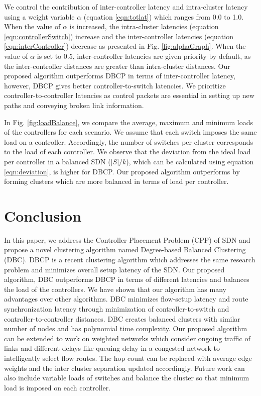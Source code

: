 \documentclass{IEEEtran}
\begin{document}
	We control the contribution of inter-controller latency and intra-cluster latency using a weight variable $\alpha$ (equation \ref{eqn:totlat}) which ranges from 0.0 to 1.0. When the value of $\alpha$ is increased, the intra-cluster latencies (equation \ref{eqn:controllerSwitch}) increase and the inter-controller latencies (equation \ref{eqn:interController}) decrease as presented in Fig. \ref{fig:alphaGraph}. When the value of $\alpha$ is set to $0.5$, inter-controller latencies are given priority by default, as the inter-controller distances are greater than intra-cluster distances. Our proposed algorithm outperforms DBCP in terms of inter-controller latency, however, DBCP gives better controller-to-switch latencies. We prioritize controller-to-controller latencies as control packets are essential in setting up new paths and conveying broken link information.
	
	In Fig. \ref{fig:loadBalance}, we compare the average, maximum and minimum loads of the controllers for each scenario. We assume that each switch imposes the same load on a controller. Accordingly, the number of switches per cluster corresponds to the load of each controller. We observe that the deviation from the ideal load per controller in a balanced SDN ($|S|/k$), which can be calculated using equation \ref{eqn:deviation}, is higher for DBCP. Our proposed algorithm outperforms by forming clusters which are more balanced in terms of load per controller.
	
	\section{Conclusion} \label{conclusion}
	In this paper, we address the Controller Placement Problem (CPP) of SDN and propose a novel clustering algorithm named Degree-based Balanced Clustering (DBC). DBCP is a recent clustering algorithm which addresses the same research problem and minimizes overall setup latency of the SDN. Our proposed algorithm, DBC outperforms DBCP in terms of different latencies and balances the load of the controllers. We have shown that our algorithm has many advantages over other algorithms. DBC minimizes flow-setup latency and route synchronization latency through minimization of controller-to-switch and controller-to-controller distances. DBC creates balanced clusters with similar number of nodes and has polynomial time complexity.
	Our proposed algorithm can be extended to work on weighted networks which consider ongoing traffic of links and different delays like queuing delay in a congested network to intelligently select flow routes. The hop count can be replaced with average edge weights and the inter cluster separation updated accordingly. Future work can also include variable loads of switches and balance the cluster so that minimum load is imposed on each controller.
	
	
	
\end{document}
